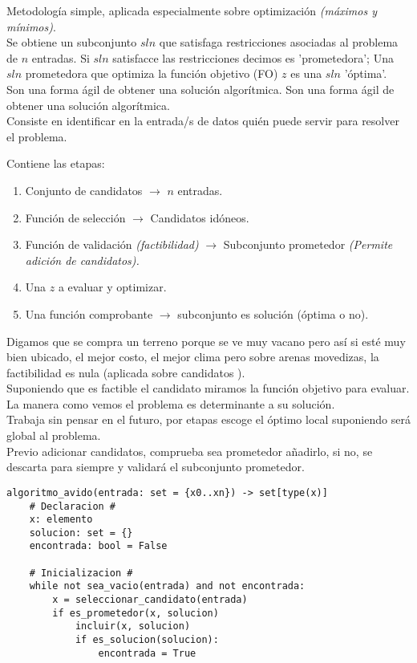 \documentclass[tikz,11pt,fleqn]{book} %
\begin{document}
Metodología simple, aplicada especialmente sobre optimización \textit{(máximos y mínimos)}.\\
Se obtiene un subconjunto $sln$ que satisfaga restricciones asociadas al problema de $n$ entradas. Si $sln$ satisfacce las restricciones decimos es 'prometedora'; Una $sln$ prometedora que optimiza la función objetivo (FO) $z$ es una $sln$ 'óptima'.
\\
Son una forma ágil de obtener una solución algorítmica.
Son una forma ágil de obtener una solución algorítmica.\\
Consiste en identificar en la entrada/s de datos quién puede servir para resolver el problema.
\\
\begin{definition}[Elementos]
    Contiene las etapas:

    \begin{enumerate}
        \item Conjunto de candidatos $\to$ $n$ entradas.
        \item Función de selección $\to$ Candidatos idóneos.
        \item Función de validación \textit{(factibilidad)} $\to$ Subconjunto prometedor \textit{(Permite adición de candidatos).}
        \item Una $z$ a evaluar y optimizar.
        \item Una función comprobante $\to$ subconjunto es solución (óptima o no). 
    \end{enumerate}
\end{definition}

Digamos que se compra un terreno porque se ve muy vacano pero así si esté muy bien ubicado, el mejor costo, el mejor clima pero sobre arenas movedizas, la factibilidad es nula (aplicada sobre candidatos
).\\
Suponiendo que es factible el candidato miramos la función objetivo para evaluar.
\\
La manera como vemos el problema es determinante a su solución.
\\

Trabaja sin pensar en el futuro, por etapas escoge el óptimo local suponiendo será global al problema.\\
Previo adicionar candidatos, comprueba sea prometedor añadirlo, si no, se descarta para siempre y validará el subconjunto prometedor.

\begin{lstlisting}
algoritmo_avido(entrada: set = {x0..xn}) -> set[type(x)]
    # Declaracion #
    x: elemento
    solucion: set = {}
    encontrada: bool = False
    
    # Inicializacion #
    while not sea_vacio(entrada) and not encontrada:
        x = seleccionar_candidato(entrada)
        if es_prometedor(x, solucion)
            incluir(x, solucion)
            if es_solucion(solucion):
                encontrada = True
\end{lstlisting}
\end{document}

